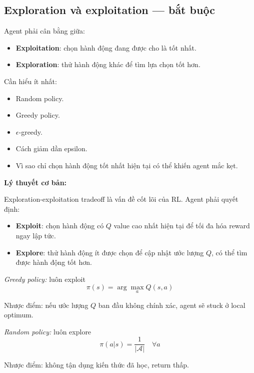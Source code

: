 \documentclass[12pt,a4paper]{article}
\begin{document}
\subsection{Exploration và exploitation --- bắt buộc}

Agent phải cân bằng giữa:

\begin{itemize}[leftmargin=1.5em]
    \item \textbf{Exploitation}: chọn hành động đang được cho là tốt nhất.
    \item \textbf{Exploration}: thử hành động khác để tìm lựa chọn tốt hơn.
\end{itemize}

Cần hiểu ít nhất:

\begin{itemize}[leftmargin=1.5em]
    \item Random policy.
    \item Greedy policy.
    \item $\epsilon$-greedy.
    \item Cách giảm dần epsilon.
    \item Vì sao chỉ chọn hành động tốt nhất hiện tại có thể khiến agent mắc kẹt.
\end{itemize}

\textbf{Lý thuyết cơ bản:}

Exploration-exploitation tradeoff là vấn đề cốt lõi của RL. Agent phải quyết định:
\begin{itemize}[leftmargin=1.5em]
    \item \textbf{Exploit}: chọn hành động có $Q$ value cao nhất hiện tại để tối đa hóa reward ngay lập tức.
    \item \textbf{Explore}: thử hành động ít được chọn để cập nhật ước lượng $Q$, có thể tìm được hành động tốt hơn.
\end{itemize}

\textit{Greedy policy:} luôn exploit
\begin{equation}
\pi(s) = \arg\max_a Q(s,a)
\end{equation}

Nhược điểm: nếu ước lượng $Q$ ban đầu không chính xác, agent sẽ stuck ở local optimum.

\textit{Random policy:} luôn explore
\begin{equation}
\pi(a|s) = \frac{1}{|\mathcal{A}|} \quad \forall a
\end{equation}

Nhược điểm: không tận dụng kiến thức đã học, return thấp.
\end{document}
